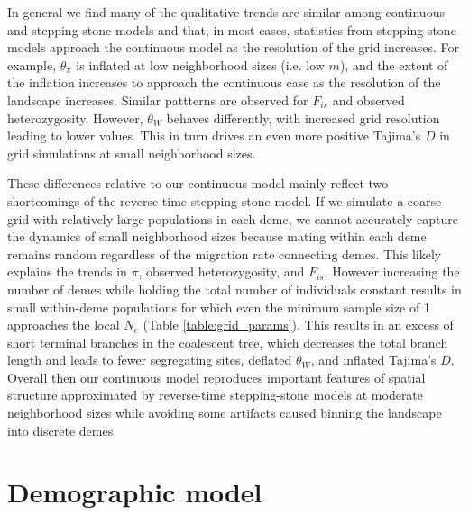 \documentclass[10pt,twoside,lineno,hidelinks]{preprint}
\begin{document}
In general we find many of the qualitative trends are similar among continuous and stepping-stone models and that, in most cases, statistics from stepping-stone models approach the continuous model as the resolution of the grid increases. For example, $\theta_\pi$ is inflated at low neighborhood sizes (i.e. low $m$), and the extent of the inflation increases to approach the continuous case as the resolution of the landscape increases. Similar pattterns are observed for $F_{is}$ and observed heterozygosity. However, $\theta_{W}$ behaves differently, with increased grid resolution leading to lower values. This in turn drives an even more positive Tajima's $D$ in grid simulations at small neighborhood sizes.

These differences relative to our continuous model mainly reflect two shortcomings of the reverse-time stepping stone model. If we simulate a coarse grid with relatively large populations in each deme, we cannot accurately capture the dynamics of small neighborhood sizes because mating within each deme remains random regardless of the migration rate connecting demes. This likely explains the trends in $\pi$, observed heterozygosity, and $F_{is}$. However increasing the number of demes while holding the total number of individuals constant results in small within-deme populations for which even the minimum sample size of 1 approaches the local $N_e$ (Table \ref{table:grid_params}). This results in an excess of short terminal branches in the coalescent tree, which decreases the total branch length and leads to fewer segregating sites, deflated $\theta_W$, and inflated Tajima's $D$. Overall then our continuous model reproduces important features of spatial structure approximated by reverse-time stepping-stone models at moderate neighborhood sizes while avoiding some artifacts caused binning the landscape into discrete demes. 

\section{Demographic model}
\label{apx:demographic_model}
\end{document}
